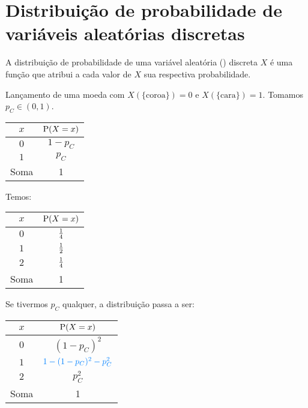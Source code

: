 \section[Variáveis aleatórias discretas]{Distribuição de probabilidade de variáveis aleatórias discretas}

\begin{definition}
    A distribuição de probabilidade de uma variável aleatória (\va) discreta
    $X$ é uma função que atribui a cada valor de $X$ sua respectiva
    probabilidade.
\end{definition}

\begin{example}
    Lançamento de uma moeda com $X(\{\text{coroa}\}) = 0$ e $X(\{\text{cara}\}) = 1$.
    Tomamos $p_C \in (0, 1)$.

    \begin{center}
        \begin{tabular}{cc}
            \toprule
            $x$ & $\operatorname{P}(X=x)$ \\
            \midrule
            $0$ & $1 - p_C$ \\
            $1$ & $p_C$ \\
            \midrule
            Soma & 1 \\
            \bottomrule
        \end{tabular}
    \end{center}
\end{example}

\begin{example}
    Temos:
    \begin{center}
        \begin{tabular}{cc}
            \toprule
            $x$ & $\operatorname{P}(X=x)$ \\
            \midrule
            $0$ & ${\textstyle\frac{1}{4}}$ \\
            $1$ & ${\textstyle\frac{1}{2}}$ \\
            $2$ & ${\textstyle\frac{1}{4}}$ \\
            \midrule
            Soma & 1 \\
            \bottomrule
        \end{tabular}
    \end{center}

    Se tivermos $p_C$ qualquer, a distribuição passa a ser:
    \begin{center}
        \begin{tabular}{cc}
            \toprule
            $x$ & $\operatorname{P}(X=x)$ \\
            \midrule
            $0$ & $(1 - p_C)^2$ \\
            $1$ & $\color{detail-color}{1 - (1 - p_C)^2 - p_C^2}$ \\
            $2$ & $p_C^2$ \\
            \midrule
            Soma & 1 \\
            \bottomrule
        \end{tabular}
    \end{center}
\end{example}

